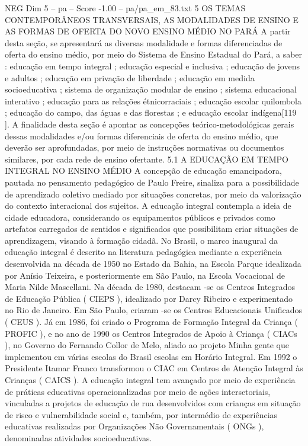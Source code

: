 \begin{textsample}{NEG Dim 5 – pa – Score -1.00 – pa/pa\_em\_83.txt}  \label{ex:f5_neg_050}
5 OS TEMAS CONTEMPORÂNEOS TRANSVERSAIS, AS MODALIDADES DE ENSINO E AS FORMAS DE OFERTA DO NOVO ENSINO MÉDIO NO PARÁ A partir desta seção, se apresentará as diversas modalidade e formas diferenciadas de oferta do ensino médio, por meio do Sistema de Ensino Estadual do Pará, a saber : educação em tempo integral ; educação especial e inclusiva ; educação de jovens e adultos ; educação em privação de liberdade ; educação em medida socioeducativa ; sistema de organização modular de ensino ; sistema educacional interativo ; educação para as relações étnicorraciais ; educação escolar quilombola ; educação do campo, das águas e das florestas ; e educação escolar indígena[119 ].
A finalidade desta seção é apontar as concepções teórico-metodológicas gerais dessas modalidades e/ou formas diferenciais de oferta do ensino médio, que deverão ser aprofundadas, por meio de instruções normativas ou documentos similares, por cada rede de ensino ofertante. 5.1 A EDUCAÇÃO EM TEMPO INTEGRAL NO ENSINO MÉDIO A concepção de educação emancipadora, pautada no pensamento pedagógico de Paulo Freire, sinaliza para a possibilidade de aprendizado coletivo mediado por situações concretas, por meio da valorização do contexto interacional dos sujeitos.
A educação integral contempla a ideia de cidade educadora, considerando os equipamentos públicos e privados como artefatos carregados de sentidos e significados que possibilitam criar situações de aprendizagem, visando à formação cidadã.
No Brasil, o marco inaugural da educação integral é descrito na literatura pedagógica mediante a experiência desenvolvida na década de 1950 no Estado da Bahia, na Escola Parque idealizada por Anísio Teixeira, e posteriormente em São Paulo, na Escola Vocacional de Maria Nilde Mascellani.
Na década de 1980, destacam -se os Centros Integrados de Educação Pública ( CIEPS ), idealizado por Darcy Ribeiro e experimentado no Rio de Janeiro.
Em São Paulo, criaram -se os Centros Educacionais Unificados ( CEUS ).
Já em 1986, foi criado o Programa de Formação Integral da Criança ( PROFIC ), e no ano de 1990 os Centros Integrados de Apoio à Criança ( CIACs ), no Governo do Fernando Collor de Melo, aliado ao projeto Minha gente que implementou em várias escolas do Brasil escolas em Horário Integral.
Em 1992 o Presidente Itamar Franco transformou o CIAC em Centros de Atenção Integral às Crianças ( CAICS ).
A educação integral tem avançado por meio de experiência de práticas educativas operacionalizadas por meio de ações intersetoriais, vinculadas a projetos de educação de rua desenvolvidos com crianças em situação de risco e vulnerabilidade social e, também, por intermédio de experiências educativas realizadas por Organizações Não Governamentais ( ONGs ), denominadas atividades socioeducativas.

\end{textsample}
